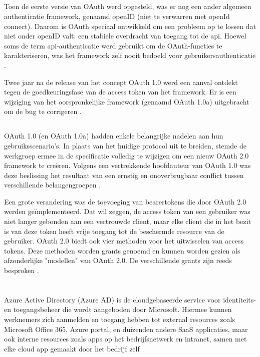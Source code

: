 \subsection{}
Toen de eerste versie van OAuth werd opgesteld, was er nog een ander algemeen authenticatie framework, genaamd openID (niet te verwarren met openId connect). Daarom is OAuth speciaal ontwikkeld om een probleem op te lossen dat niet onder openID valt: een stabiele overdracht van toegang tot de api. Hoewel soms de term api-authenticatie werd gebruikt om de OAuth-functies te karakteriseren, was het framework zelf nooit bedoeld voor gebruikersauthenticatie \autocite{Chen2014}.

Twee jaar na de release van het concept OAuth 1.0 werd een aanval ontdekt tegen de goedkeuringsfase van de access token van het framework. Er is een wijziging van het oorspronkelijke framework (genaamd OAuth 1.0a) uitgebracht om de bug te corrigeren \autocite{Chen2014}.
\subsection{}
OAuth 1.0 (en OAuth 1.0a) hadden enkele belangrijke nadelen aan hun gebruiksscenario's. In plaats van het huidige protocol uit te breiden, stemde de werkgroep ermee in de specificatie volledig te wijzigen om een nieuw OAuth 2.0 framework te creëren. Volgens een vertrekkende hoofdauteur van OAuth 1.0 was deze beslissing het resultaat van een ernstig en onoverbrugbaar conflict tussen verschillende belangengroepen \autocite{Chen2014}.

Een grote verandering was de toevoeging van bearertokens die door OAuth 2.0 werden geïmplementeerd. Dat wil zeggen, de access token van een gebruiker was niet langer gebonden aan een vertrouwde client, maar elke client die in het bezit is van deze token heeft vrije toegang tot de beschermde resource van de gebruiker. OAuth 2.0 biedt ook vier methoden voor het uitwisselen van access tokens. Deze methoden worden grants genoemd en kunnen worden gezien als afzonderlijke "modellen" van OAuth 2.0. De verschillende grants zijn reeds besproken \autocite{Chen2014}.
\section{}
\label{sec:AzureRollingKeys}
Azure Active Directory (Azure AD) is de cloudgebaseerde service voor identiteits- en toegangsbeheer die wordt aangeboden door Microsoft. Hiermee kunnen werknemers zich aanmelden en toegang hebben tot external resources zoals Microsoft Office 365, Azure portal, en duizenden andere SaaS applicaties, maar ook interne resources zoals apps op het bedrijfsnetwerk en intranet, samen met elke cloud app gemaakt door het bedrijf zelf \autocite{Boucher2019} \autocite{msaburnley2019}.
